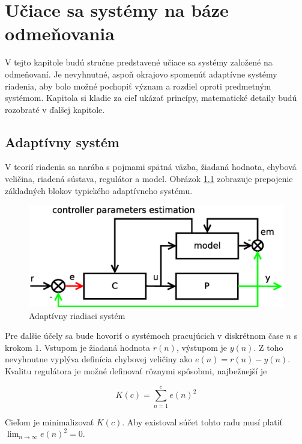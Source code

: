 \chapter{Učiace sa systémy na báze odmeňovania}

V tejto kapitole budú stručne predstavené učiace sa systémy založené na odmeňovaní.
Je nevyhnutné, aspoň okrajovo spomenúť adaptívne systémy riadenia, aby bolo možné
pochopiť význam a rozdiel oproti predmetným systémom. Kapitola si kladie za cieľ
ukázať princípy, matematické detaily budú rozobraté v ďalšej kapitole.

\section{Adaptívny systém}

V teorií riadenia sa narába s pojmami spätná väzba, žiadaná hodnota,
chybová veličina, riadená sústava, regulátor a model. Obrázok \ref{img:adaptive_controll_system} zobrazuje
prepojenie základných blokov typického adaptívneho systému.


\begin{figure}[!htb]
\center
\includegraphics[scale=.6]{../diagrams/adaptive_system.eps}
\caption{Adaptívny riadiaci systém}
\label{img:adaptive_controll_system}
\end{figure}

Pre ďalšie účely sa bude hovoriť o systémoch pracujúcich v diskrétnom čase $n$ s
krokom $1$. Vstupom je žiadaná hodnota $r(n)$, výstupom je $y(n)$. Z toho nevyhnutne
vyplýva definícia chybovej veličiny ako $e(n) = r(n) - y(n)$.
Kvalitu regulátora je možné definovať rôznymi spôsobmi, najbežnejší je

\begin{equation}
K(c) = \sum\limits_{n=1}^{c}{e(n)^2}
\label{eq:controller_quality}
\end{equation}

Cieľom je minimalizovať $K(c)$. Aby existoval súčet tohto radu musí platiť $\lim_{n\to\infty}e(n)^2=0$.

